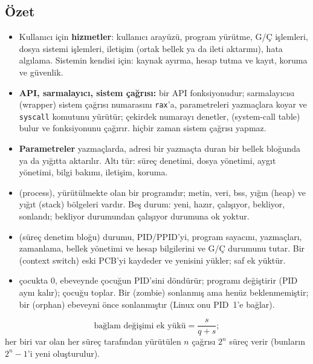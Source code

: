 \subsection*{Özet}
\begin{itemize}
  \item Kullanıcı için \textbf{hizmetler}: kullanıcı arayüzü, program yürütme, G/Ç işlemleri, dosya sistemi işlemleri, iletişim (ortak bellek ya da ileti aktarımı), hata algılama. Sistemin kendisi için: kaynak ayırma, hesap tutma ve kayıt, koruma ve güvenlik.
  \item \textbf{API, sarmalayıcı, sistem çağrısı:}  bir API fonksiyonudur;  sarmalayıcısı (wrapper) sistem çağrısı numarasını \texttt{rax}'a, parametreleri yazmaçlara koyar ve \texttt{syscall} komutunu yürütür; çekirdek numarayı denetler,  (system-call table) bulur ve  fonksiyonunu çağırır.  hiçbir zaman sistem çağrısı yapmaz.
  \item \textbf{Parametreler} yazmaçlarda, adresi bir yazmaçta duran bir bellek bloğunda ya da yığıtta aktarılır. Altı tür: süreç denetimi, dosya yönetimi, aygıt yönetimi, bilgi bakımı, iletişim, koruma.
  \item {} (process), yürütülmekte olan bir programdır; metin, veri, bss, yığın (heap) ve yığıt (stack) bölgeleri vardır. Beş durum: yeni, hazır, çalışıyor, bekliyor, sonlandı; bekliyor durumundan çalışıyor durumuna ok yoktur.
  \item {} (süreç denetim bloğu) durumu, PID/PPID'yi, program sayacını, yazmaçları, zamanlama, bellek yönetimi ve hesap bilgilerini ve G/Ç durumunu tutar. Bir  (context switch) eski PCB'yi kaydeder ve yenisini yükler; saf ek yüktür.
  \item {} çocukta $0$, ebeveynde çocuğun PID'sini döndürür;  programı değiştirir (PID aynı kalır);  çocuğu toplar. Bir  (zombie) sonlanmış ama henüz beklenmemiştir; bir  (orphan) ebeveyni önce sonlanmıştır (Linux onu PID~1'e bağlar).
\end{itemize}

\begin{keyidea}
\[
\text{bağlam değişimi ek yükü} = \frac{s}{q+s};
\]
her biri var olan her süreç tarafından yürütülen $n$  çağrısı $2^{n}$ süreç verir (bunların $2^{n}-1$'i yeni oluşturulur).
\end{keyidea}

